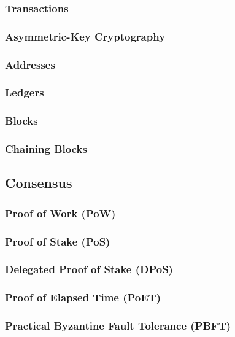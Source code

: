 \subsubsection{Transactions}

\subsubsection{Asymmetric-Key Cryptography}

\subsubsection{Addresses}

\subsubsection{Ledgers}

\subsubsection{Blocks}

\subsubsection{Chaining Blocks}

\subsection{Consensus}

\subsubsection{Proof of Work (PoW)}

\subsubsection{Proof of Stake (PoS)}

\subsubsection{Delegated Proof of Stake (DPoS)}

\subsubsection{Proof of Elapsed Time (PoET)}

\subsubsection{Practical Byzantine Fault Tolerance (PBFT)}

